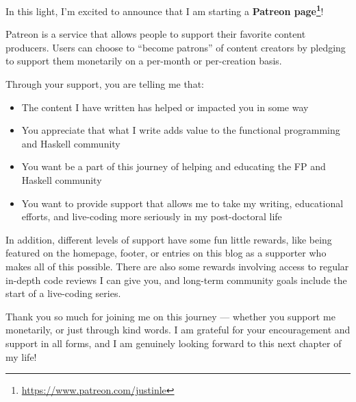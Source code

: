 \documentclass[]{article}
\renewcommand{\href}[2]{#2\footnote{\url{#1}}}
\begin{document}
In this light, I'm excited to announce that I am starting a
\textbf{\href{https://www.patreon.com/justinle}{Patreon page}}!

Patreon is a service that allows people to support their favorite content
producers. Users can choose to ``become patrons'' of content creators by
pledging to support them monetarily on a per-month or per-creation basis.

Through your support, you are telling me that:

\begin{itemize}
\tightlist
\item
  The content I have written has helped or impacted you in some way
\item
  You appreciate that what I write adds value to the functional programming and
  Haskell community
\item
  You want be a part of this journey of helping and educating the FP and Haskell
  community
\item
  You want to provide support that allows me to take my writing, educational
  efforts, and live-coding more seriously in my post-doctoral life
\end{itemize}

In addition, different levels of support have some fun little rewards, like
being featured on the homepage, footer, or entries on this blog as a supporter
who makes all of this possible. There are also some rewards involving access to
regular in-depth code reviews I can give you, and long-term community goals
include the start of a live-coding series.

Thank you so much for joining me on this journey --- whether you support me
monetarily, or just through kind words. I am grateful for your encouragement and
support in all forms, and I am genuinely looking forward to this next chapter of
my life!
\end{document}
